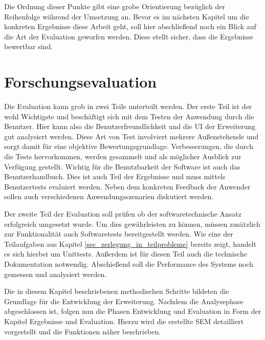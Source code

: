 Die Ordnung dieser Punkte gibt eine grobe Orientierung bezüglich der Reihenfolge
während der Umsetzung an. Bevor es im nächsten Kapitel um die konkreten Ergebnisse
diese Arbeit geht, soll hier abschließend noch ein Blick auf die Art der
Evaluation geworfen werden. Diese stellt sicher, dass die Ergebnisse bewertbar
sind.

\section{Forschungsevaluation}
Die Evaluation kann grob in zwei Teile unterteilt werden. Der erste Teil ist der
wohl Wichtigste und beschäftigt sich mit dem Testen der Anwendung durch die Benutzer.
Hier kann also die Benutzerfreundlichkeit und die \ac{UI} der Erweiterung gut analysiert
werden. Diese Art von Test involviert mehrere Außenstehende und sorgt damit für
eine objektive Bewertungsgrundlage. Verbesserungen, die durch die Tests
hervorkommen, werden gesammelt und als möglicher Ausblick zur Verfügung gestellt.
Wichtig für die Benutzbarkeit der Software ist auch das Benutzerhandbuch. Dies ist
auch Teil der Ergebnisse und muss mittels Benutzertests evaluiert werden. Neben
dem konkreten Feedback der Anwender sollen auch verschiedenen
Anwendungsszenarien diskutiert werden.

Der zweite Teil der Evaluation soll prüfen ob der softwaretechnische Ansatz
erfolgreich umgesetzt wurde. Um dies gewährleisten zu können, müssen zusätzlich
zur Funktionalität auch Softwaretests bereitgestellt werden. Wie eine der Teilaufgaben
aus Kapitel \ref{sec_zerlegung_in_teilprobleme} bereits zeigt, handelt es sich
hierbei um Unittests. Außerdem ist für diesen Teil auch die technische Dokumentation
notwendig. Abschießend soll die Performance des Systems noch gemessen und
analysiert werden.

Die in diesem Kapitel beschriebenen methodischen Schritte bildeten die Grundlage
für die Entwicklung der Erweiterung. Nachdem die Analysephase abgeschlossen ist,
folgen nun die Phasen Entwicklung und Evaluation in Form der Kapitel Ergebnisse
und Evaluation. Hierzu wird die erstellte \ac{SEM} detailliert vorgestellt und
die Funktionen näher beschrieben.
